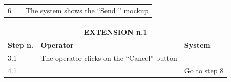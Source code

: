 {{{\begin{center}
\begin{tabular}{|p{2cm}|p{6cm}|p{6cm}|}
				\vspace{1mm} \vspace{1mm} \\
			\hline
				\vspace{1mm} 6 \vspace{1mm} &
				\vspace{1mm} \vspace{1mm} & 
				\vspace{1mm} The system shows the “Send ” mockup \vspace{1mm} \\
			\hline	
			\end{tabular}

			\begin{tabular}{|p{2cm}|p{6cm}|p{6cm}|}
			\hline
				\multicolumn{3}{|c|}{EXTENSION n.1} \\
			\hline
				\centering \vspace{1mm} \bfseries{Step n.} \vspace{1mm} & \vspace{1mm} \bfseries{Operator} \vspace{1mm} & \vspace{1mm} \bfseries{System} \vspace{1mm}\\
			\hline
				\vspace{1mm} 3.1 \vspace{1mm} &
				\vspace{1mm} The operator clicks on the “Cancel” button \vspace{1mm} & 
				\vspace{1mm} \vspace{1mm} \\
			\hline
				\vspace{1mm} 4.1 \vspace{1mm} &
				\vspace{1mm} \vspace{1mm} & 
				\vspace{1mm} Go to step 8\vspace{1mm} \\
			\hline
			\end{tabular}


\end{center}}}}
